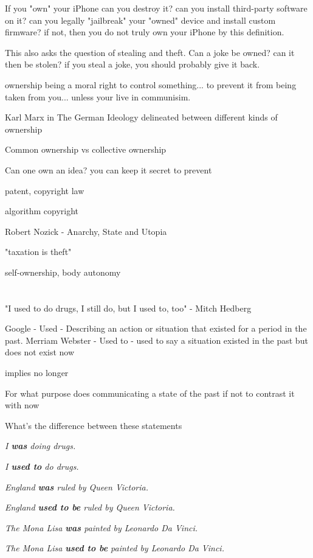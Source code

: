 If you "own" your iPhone can you destroy it? can you install third-party software on it? can you legally "jailbreak" your "owned" device and install custom firmware? if not, then you do not truly own your iPhone by this definition.

This also asks the question of stealing and theft. Can a joke be owned? can it then be stolen? if you steal a joke, you should probably give it back. 

ownership being a moral right to control something... to prevent it from being taken from you... unless your live in communisim. 

Karl Marx in The German Ideology delineated between different kinds of ownership

Common ownership vs collective ownership

Can one own an idea? you can keep it secret to prevent

patent, copyright law

algorithm copyright

Robert Nozick - Anarchy, State and Utopia

"taxation is theft"

self-ownership, body autonomy

\section{}
"I used to do drugs, I still do, but I used to, too" - Mitch Hedberg

Google - Used - Describing an action or situation that existed for a period in the past.
Merriam Webster - Used to - used to say a situation existed in the past but does not exist now

implies no longer

For what purpose does communicating a state of the past if not to contrast it with now


What's the difference between these statements

\textit{I \textbf{was} doing drugs.}

\textit{I \textbf{used to} do drugs.}

\textit{England \textbf{was} ruled by Queen Victoria.}

\textit{England \textbf{used to be} ruled by Queen Victoria.}

\textit{The Mona Lisa \textbf{was} painted by Leonardo Da Vinci.}

\textit{The Mona Lisa \textbf{used to be} painted by Leonardo Da Vinci.}

